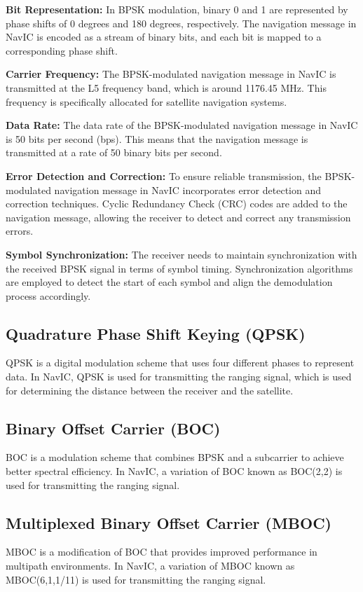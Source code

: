 \documentclass[10pt, onecolumn]{article}
\begin{document}
\begin{enumerate}
\textbf{Bit Representation:} In BPSK modulation, binary 0 and 1 are represented by phase shifts of 0 degrees and 180 degrees, respectively. The navigation message in NavIC is encoded as a stream of binary bits, and each bit is mapped to a corresponding phase shift.

\textbf{Carrier Frequency:} The BPSK-modulated navigation message in NavIC is transmitted at the L5 frequency band, which is around 1176.45 MHz. This frequency is specifically allocated for satellite navigation systems.

\textbf{Data Rate:} The data rate of the BPSK-modulated navigation message in NavIC is 50 bits per second (bps). This means that the navigation message is transmitted at a rate of 50 binary bits per second.

\textbf{Error Detection and Correction:} To ensure reliable transmission, the BPSK-modulated navigation message in NavIC incorporates error detection and correction techniques. Cyclic Redundancy Check (CRC) codes are added to the navigation message, allowing the receiver to detect and correct any transmission errors.

\textbf{Symbol Synchronization:} The receiver needs to maintain synchronization with the received BPSK signal in terms of symbol timing. Synchronization algorithms are employed to detect the start of each symbol and align the demodulation process accordingly.

\subsection{Quadrature Phase Shift Keying (QPSK)}

QPSK is a digital modulation scheme that uses four different phases to represent data. In NavIC, QPSK is used for transmitting the ranging signal, which is used for determining the distance between the receiver and the satellite.
\subsection{Binary Offset Carrier (BOC)} 
BOC is a modulation scheme that combines BPSK and a subcarrier to achieve better spectral efficiency. In NavIC, a variation of BOC known as BOC(2,2) is used for transmitting the ranging signal.
\subsection{Multiplexed Binary Offset Carrier (MBOC)}
MBOC is a modification of BOC that provides improved performance in multipath environments. In NavIC, a variation of MBOC known as MBOC(6,1,1/11) is used for transmitting the ranging signal.

\end{enumerate}
\end{document}
